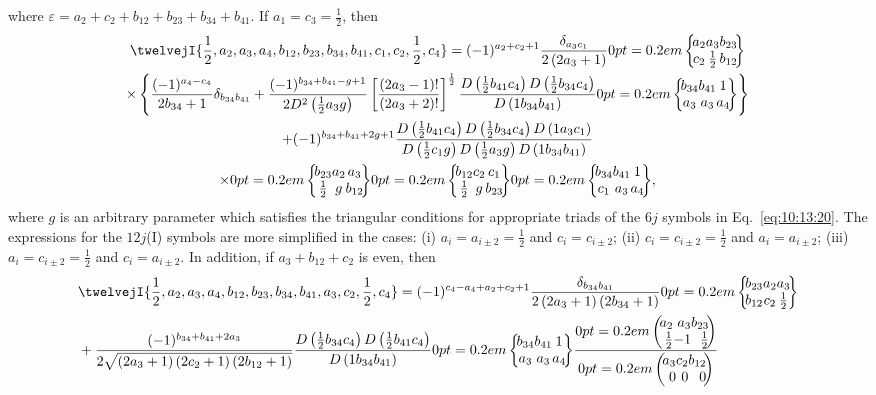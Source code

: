 where $\varepsilon=a_{2}+c_{2}+b_{12}+b_{23}+b_{34}+b_{41}$. If $a_{1}=c_{3}=\frac{1}{2}$, then
\begin{gather}
\twelvejI{\frac{1}{2},a_{2},a_{3},a_{4},b_{12},b_{23},b_{34},b_{41},c_{1},c_{2},\frac{1}{2},c_{4}}=(-1)^{a_{2}+c_{2}+1} \frac{\delta_{a_{3} c_{1}}}{2\left(2 a_{3}+1\right)}\sixj{a_{2}}{a_{3}}{b_{23}}{c_{2}}{\frac{1}{2}}{b_{12}}  \notag\\
\times\left\{\frac{(-1)^{a_{4}-c_{4}}}{2 b_{34}+1} \delta_{b_{34} b_{41}}+\frac{(-1)^{b_{34}+b_{41}-g+1}}{2 D^{2}\left(\frac{1}{2} a_{3} g\right)}\left[\frac{\left(2 a_{3}-1\right)!}{\left(2 a_{3}+2\right)!}\right]^{\frac{1}{2}} \frac{D\left(\frac{1}{2} b_{41} c_{4}\right) D\left(\frac{1}{2} b_{34} c_{4}\right)}{D\left(1 b_{34} b_{41}\right)}\sixj{b_{34}}{b_{41}}{1}{a_{3}}{a_{3}}{a_{4}}\right\}  \notag\\
+(-1)^{b_{34}+b_{41}+2 g+1} \frac{D\left(\frac{1}{2} b_{41} c_{4}\right) D\left(\frac{1}{2} b_{34} c_{4}\right) D\left(1 a_{3} c_{1}\right)}{D\left(\frac{1}{2} c_{1} g\right) D\left(\frac{1}{2} a_{3} g\right) D\left(1 b_{34} b_{41}\right)}  \notag\\
\times\sixj{b_{23}}{a_{2}}{a_{3}}{\frac{1}{2}}{g}{b_{12}}\sixj{b_{12}}{c_{2}}{c_{1}}{\frac{1}{2}}{g}{b_{23}}\sixj{b_{34}}{b_{41}}{1}{c_{1}}{a_{3}}{a_{4}}, \label{eq:10:13:20}
\end{gather}
where $g$ is an arbitrary parameter which satisfies the triangular conditions for appropriate triads of the $6 j$ symbols in Eq.~\eqref{eq:10:13:20}. The expressions for the $12j$(I) symbols are more simplified in the cases: (i) $a_{i}=a_{i \pm 2}=\frac{1}{2}$ and $c_{i}=c_{i \pm 2}$; (ii) $c_{i}=c_{i \pm 2}=\frac{1}{2}$ and $a_{i}=a_{i \pm 2}$; (iii) $a_{i}=c_{i \pm 2}=\frac{1}{2}$ and $c_{i}=a_{i \pm 2}$. In addition, if $a_{3}+b_{12}+c_{2}$ is even, then
\begin{align}
& \twelvejI{\frac{1}{2},a_{2},a_{3},a_{4},b_{12},b_{23},b_{34},b_{41},a_{3},c_{2},\frac{1}{2},c_{4}}=(-1)^{c_{4}-a_{4}+a_{2}+c_{2}+1} \frac{\delta_{b_{34} b_{41}}}{2\left(2 a_{3}+1\right)\left(2 b_{34}+1\right)}\sixj{b_{23}}{a_{2}}{a_{3}}{b_{12}}{c_{2}}{\frac{1}{2}}  \notag\\
& +\frac{(-1)^{b_{34}+b_{41}+2 a_{3}}}{2 \sqrt{\left(2 a_{3}+1\right)\left(2 c_{2}+1\right)\left(2 b_{12}+1\right)}} \frac{D\left(\frac{1}{2} b_{34} c_{4}\right) D\left(\frac{1}{2} b_{41} c_{4}\right)}{D\left(1 b_{34} b_{41}\right)}\sixj{b_{34}}{b_{41}}{1}{a_{3}}{a_{3}}{a_{4}} \frac{\threej{a_{2} }{ a_{3} }{ b_{23} }{\frac{1}{2} }{ -1 }{ \frac{1}{2}}}{\threej{a_{3} }{ c_{2} }{ b_{12} }{0 }{ 0 }{ 0}} \label{eq:10:13:21}
\end{align}
